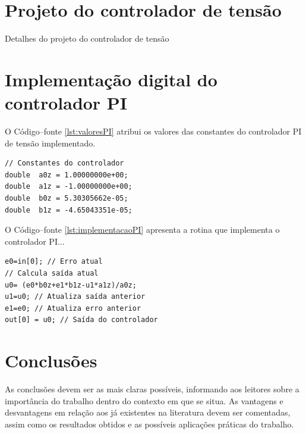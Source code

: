 \section{Projeto do controlador de tensão}
Detalhes do projeto do controlador de tensão


\section{Implementação digital do controlador PI}

O Código--fonte \ref{lst:valoresPI} atribui os valores das constantes do controlador PI de tensão implementado.
\begin{lstlisting}[caption={Parâmetros do controlador PI digital de tensão.},label={lst:valoresPI}]
// Constantes do controlador
double  a0z = 1.00000000e+00;
double  a1z = -1.00000000e+00;
double  b0z = 5.30305662e-05;
double  b1z = -4.65043351e-05;
\end{lstlisting}
O Código--fonte \ref{lst:implementacaoPI} apresenta a rotina que implementa o controlador PI...
\begin{lstlisting}[caption={Implementação do controlador PI digital de tensão.},label={lst:implementacaoPI}]
e0=in[0]; // Erro atual
// Calcula saída atual 
u0= (e0*b0z+e1*b1z-u1*a1z)/a0z; 
u1=u0; // Atualiza saída anterior
e1=e0; // Atualiza erro anterior    
out[0] = u0; // Saída do controlador
\end{lstlisting}


\section{Conclusões} 


As conclusões devem ser as mais claras possíveis, informando aos leitores sobre a importância do trabalho dentro do contexto em que se situa. As vantagens e desvantagens em relação aos já existentes na literatura devem ser comentadas, assim como os resultados obtidos e as possíveis aplicações práticas do trabalho.





\balance


